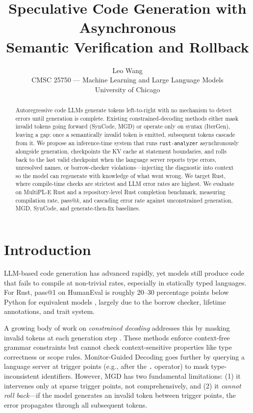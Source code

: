 \documentclass[11pt,letterpaper]{article}
\title{\textbf{Speculative Code Generation with Asynchronous\\Semantic Verification and Rollback}}
\author{
  Leo Wang \\
  CMSC 25750 --- Machine Learning and Large Language Models \\
  University of Chicago
}
\date{}
\begin{document}
\maketitle

\begin{abstract}
Autoregressive code LLMs generate tokens left-to-right with no mechanism to detect errors until generation is complete. Existing constrained-decoding methods either mask invalid tokens going forward (SynCode, MGD) or operate only on syntax (IterGen), leaving a gap: once a semantically invalid token is emitted, subsequent tokens cascade from it. We propose an inference-time system that runs \texttt{rust-analyzer} asynchronously alongside generation, checkpoints the KV cache at statement boundaries, and rolls back to the last valid checkpoint when the language server reports type errors, unresolved names, or borrow-checker violations---injecting the diagnostic into context so the model can regenerate with knowledge of what went wrong. We target Rust, where compile-time checks are strictest and LLM error rates are highest. We evaluate on MultiPL-E Rust and a repository-level Rust completion benchmark, measuring compilation rate, pass@$k$, and cascading error rate against unconstrained generation, MGD, SynCode, and generate-then-fix baselines.
\end{abstract}

\section{Introduction}

LLM-based code generation has advanced rapidly, yet models still produce code that fails to compile at non-trivial rates, especially in statically typed languages. For Rust, pass@1 on HumanEval is roughly 20--30 percentage points below Python for equivalent models \citep{cassano2023multiple}, largely due to the borrow checker, lifetime annotations, and trait system.

A growing body of work on \emph{constrained decoding} addresses this by masking invalid tokens at each generation step \citep{willard2023outlines,ugare2024syncode,poesia2022synchromesh}. These methods enforce context-free grammar constraints but cannot check context-sensitive properties like type correctness or scope rules. Monitor-Guided Decoding \citep[MGD;][]{agrawal2023mgd} goes further by querying a language server at trigger points (e.g., after the \texttt{.} operator) to mask type-inconsistent identifiers. However, MGD has two fundamental limitations: (1) it intervenes only at sparse trigger points, not comprehensively, and (2) it \emph{cannot roll back}---if the model generates an invalid token between trigger points, the error propagates through all subsequent tokens.
\end{document}
